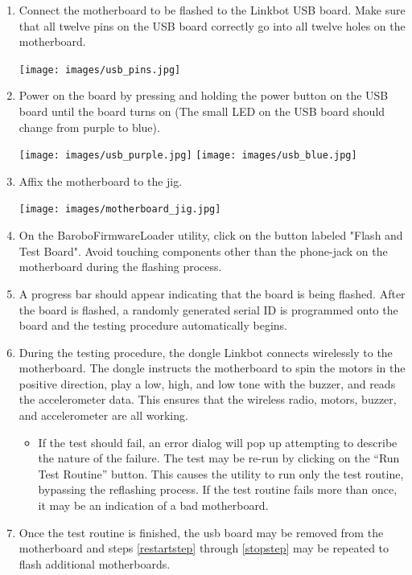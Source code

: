\documentclass{article}
\begin{document}
\begin{enumerate}
\item \label{restartstep}Connect the motherboard to be flashed to the Linkbot USB board. Make sure
   that all twelve pins on the USB board correctly go into all twelve holes on
   the motherboard.

   \begin{center}
   \texttt{[image: images/usb\_pins.jpg]}
   \end{center}

\item Power on the board by pressing and holding the power button on the USB board
   until the board turns on (The small LED on the USB board should change from
   purple to blue).

   \begin{center}
   \texttt{[image: images/usb\_purple.jpg]}
   \texttt{[image: images/usb\_blue.jpg]}
   \end{center}

\item Affix the motherboard to the jig. 

   \begin{center}
   \texttt{[image: images/motherboard\_jig.jpg]}
   \end{center}

\item On the BaroboFirmwareLoader utility, click on the button labeled "Flash
  and Test Board". Avoid touching components other than the phone-jack on the
  motherboard during the flashing process.
\item A progress bar should appear indicating that the board is being flashed. 
  After the board is flashed, a randomly generated serial ID is programmed onto 
  the board and the testing procedure automatically begins.
\item During the testing procedure, the dongle Linkbot connects wirelessly to
  the motherboard. The dongle instructs the motherboard to spin the motors in the
  positive direction, play a low, high, and low tone with the buzzer, and reads
  the accelerometer data. This ensures that the wireless radio, motors, buzzer, and
  accelerometer are all working.
  \begin{itemize}
    \item If the test should fail, an error dialog will pop up attempting to
    describe the nature of the failure. The test may be re-run by clicking on
    the ``Run Test Routine'' button. This causes the utility to run only the
    test routine, bypassing the reflashing process. If the test routine fails
    more than once, it may be an indication of a bad motherboard.
  \end{itemize}
\item \label{stopstep} Once the test routine is finished, the usb board may be removed from the
  motherboard and steps \ref{restartstep} through
  \ref{stopstep} may be repeated to flash additional motherboards.
\end{enumerate}
\end{document}
